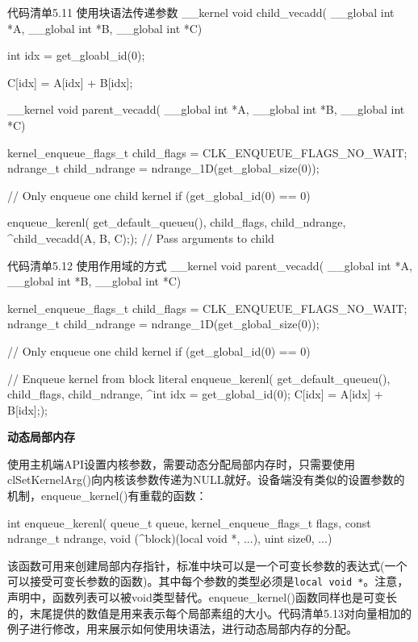 \begin{codeboxt}[cpp]{代码清单5.11 使用块语法传递参数}
__kernel
void child_vecadd(
  __global int *A,
  __global int *B,
  __global int *C){

  int idx = get_gloabl_id(0);

  C[idx] = A[idx] + B[idx];
}

__kernel
void parent_vecadd(
  __global int *A,
  __global int *B,
  __global int *C){

  kernel_enqueue_flags_t child_flags = CLK_ENQUEUE_FLAGS_NO_WAIT;
  ndrange_t child_ndrange = ndrange_1D(get_global_size(0));

  // Only enqueue one child kernel
  if (get_global_id(0) == 0){

    enqueue_kerenl(
      get_default_queueu(),
      child_flags,
      child_ndrange,
      ^{child_vecadd(A, B, C);}); // Pass arguments to child
  }
}
\end{codeboxt}

\begin{codeboxt}[cpp]{代码清单5.12 使用作用域的方式}
__kernel
void parent_vecadd(
  __global int *A,
  __global int *B,
  __global int *C){

  kernel_enqueue_flags_t child_flags = CLK_ENQUEUE_FLAGS_NO_WAIT;
  ndrange_t child_ndrange = ndrange_1D(get_global_size(0));

  // Only enqueue one child kernel
  if (get_global_id(0) == 0){

    // Enqueue kernel from block literal
    enqueue_kerenl(
      get_default_queueu(),
      child_flags,
      child_ndrange,
      ^{int idx = get_global_id(0);
        C[idx] = A[idx] + B[idx];});
  }
}
\end{codeboxt}

\textbf{动态局部内存}

使用主机端API设置内核参数，需要动态分配局部内存时，只需要使用clSetKernelArg()向内核该参数传递为NULL就好。设备端没有类似的设置参数的机制，enqueue\_\allowbreak{}kernel()有重载的函数：

\begin{codebox}[cpp]
int
enqueue_kerenl(
  queue_t queue,
  kernel_enqueue_flags_t flags,
  const ndrange_t ndrange,
  void (^block)(local void *, ...),
  uint size0, ...)
\end{codebox}

该函数可用来创建局部内存指针，标准中块可以是一个可变长参数的表达式(一个可以接受可变长参数的函数)。其中每个参数的类型必须是\texttt{local void *}。注意，声明中，函数列表可以被void类型替代。enqueue\_\allowbreak{}kernel()函数同样也是可变长的，末尾提供的数值是用来表示每个局部素组的大小。代码清单5.13对向量相加的例子进行修改，用来展示如何使用块语法，进行动态局部内存的分配。

